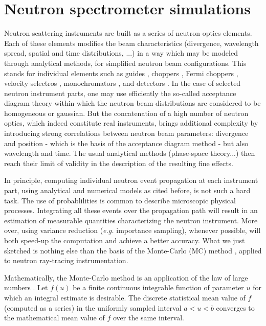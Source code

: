 \section{Neutron spectrometer simulations}

Neutron scattering instruments are built as a series of neutron optics elements. Each of these elements modifies the beam characteristics (divergence, wavelength spread, spatial and time distributions, ...) in a way which may be modeled through analytical methods, for simplified neutron beam configurations.
This stands for individual elements such as guides \cite{Leibnitz63,Mildner90}, choppers \cite{Lowde60,Copley03}, Fermi choppers \cite{Fermi47,Peters05}, velocity selectros \cite{Clark66}, monochromators \cite{Freund83,Sears97,Shirane02,Alianelli04}, and detectors \cite{Radeka74,Charpak89,Manzin04}.
In the case of selected neutron instrument parts, one may use efficiently the so-called acceptance diagram theory \cite{Mildner90,Copley93,Cussen03} within which the neutron beam distributions are considered to be homogeneous or gaussian.
But the concatenation of a high number of neutron optics, which indeed constitute real instruments, brings additional complexity by introducing strong correlations between neutron beam parameters: divergence and position - which is the basis of the acceptance diagram method - but also wavelength and time. The usual analytical methods (phase-space theory...) then reach their limit of validity in the description of the resulting fine effects.

In principle, computing individual neutron event propagation at each instrument part, using analytical and numerical models as cited before, is not such a hard task. The use of probablilities is common to describe microscopic physical processes. Integrating all these events over the propagation path will result in an estimation of measurable quantities characterizing the neutron instrument. More over, using variance reduction ({\it e.g.} importance sampling), whenever possible, will both speed-up the computation and achieve a better accuracy. What we just sketched is nothing else than the basis of the Monte-Carlo (MC) method \cite{James80}, applied to neutron ray-tracing instrumentation.

Mathematically, the Monte-Carlo method is an application of the law of large numbers \cite{James80,Grimmett92}. Let $f(u)$ be a finite continuous integrable function of parameter $u$ for which an integral estimate is desirable. The discrete statistical mean value of $f$ (computed as a series) in the uniformly sampled interval $a < u < b$ converges to the mathematical mean value of $f$ over the same interval.

